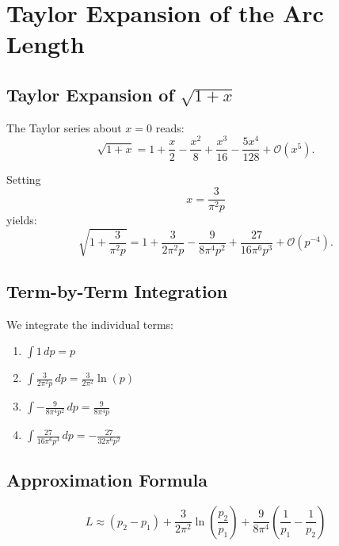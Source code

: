 \chapter{Taylor Expansion of the Arc Length}\label{sec:taylor}


\section{Taylor Expansion of \texorpdfstring{$\sqrt{1+x}$}{sqrt(1+x)}}

The Taylor series about $x=0$ reads:
\begin{equation}
\sqrt{1+x}
= 1 + \frac{x}{2} - \frac{x^2}{8} + \frac{x^3}{16}
  - \frac{5x^4}{128} + \mathcal{O}(x^5).
\end{equation}

Setting
\[
x = \frac{3}{\pi^2 p}
\]
yields:
\begin{equation}
\sqrt{1 + \frac{3}{\pi^2 p}}
= 1
+ \frac{3}{2\pi^2 p}
- \frac{9}{8\pi^4 p^2}
+ \frac{27}{16\pi^6 p^3}
+ \mathcal{O}(p^{-4}).
\end{equation}

\section{Term-by-Term Integration}

We integrate the individual terms:
\begin{enumerate}
\item $\displaystyle \int 1\, dp = p$
\item $\displaystyle \int \frac{3}{2\pi^2 p}\, dp
= \frac{3}{2\pi^2}\ln(p)$
\item $\displaystyle \int -\frac{9}{8\pi^4 p^2}\, dp
= \frac{9}{8\pi^4 p}$
\item $\displaystyle \int \frac{27}{16\pi^6 p^3}\, dp
= -\frac{27}{32\pi^6 p^2}$
\end{enumerate}

\section{Approximation Formula}

\begin{theorem}
\begin{equation}
\boxed{
L \approx (p_2 - p_1)
+ \frac{3}{2\pi^2}\ln\!\left(\frac{p_2}{p_1}\right)
+ \frac{9}{8\pi^4}\left(\frac{1}{p_1} - \frac{1}{p_2}\right)
}
\end{equation}
\end{theorem}

